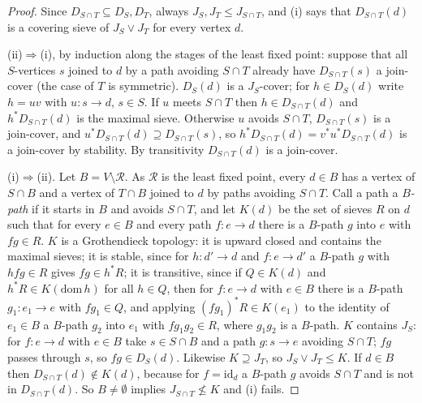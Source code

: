 \documentclass[11pt]{amsart}
\theoremstyle{definition}
\begin{document}
\begin{proof}
Since $D_{S\cap T}\subseteq D_S,D_T$, always $J_S,J_T\le J_{S\cap T}$, and
(i) says that $D_{S\cap T}(d)$ is a covering sieve of $J_S\vee J_T$ for
every vertex $d$.

(ii)$\Rightarrow$(i), by induction along the stages of the least fixed
point: suppose that all $S$-vertices $s$ joined to $d$ by a path avoiding
$S\cap T$ already have $D_{S\cap T}(s)$ a join-cover (the case of $T$ is
symmetric). $D_S(d)$ is a $J_S$-cover; for $h\in D_S(d)$ write $h=uv$
with $u\colon s\to d$, $s\in S$. If $u$ meets $S\cap T$ then $h\in
D_{S\cap T}(d)$ and $h^*D_{S\cap T}(d)$ is the maximal sieve. Otherwise
$u$ avoids $S\cap T$, $D_{S\cap T}(s)$ is a join-cover, and
$u^*D_{S\cap T}(d)\supseteq D_{S\cap T}(s)$, so $h^*D_{S\cap T}(d)=
v^*u^*D_{S\cap T}(d)$ is a join-cover by stability. By transitivity
$D_{S\cap T}(d)$ is a join-cover.

(i)$\Rightarrow$(ii). Let $B=V\setminus\mathcal R$. As $\mathcal R$ is the
least fixed point, every $d\in B$ has a vertex of $S\cap B$ and a vertex of
$T\cap B$ joined to $d$ by paths avoiding $S\cap T$. Call a path a
\emph{$B$-path} if it starts in $B$ and avoids $S\cap T$, and let $K(d)$
be the set of sieves $R$ on $d$ such that for every $e\in B$ and every
path $f\colon e\to d$ there is a $B$-path $g$ into $e$ with $fg\in R$.
$K$ is a Grothendieck topology: it is upward closed and contains the
maximal sieves; it is stable, since for $h\colon d'\to d$ and $f\colon
e\to d'$ a $B$-path $g$ with $hfg\in R$ gives $fg\in h^*R$; it is
transitive, since if $Q\in K(d)$ and $h^*R\in K(\mathrm{dom}\,h)$ for all
$h\in Q$, then for $f\colon e\to d$ with $e\in B$ there is a $B$-path
$g_1\colon e_1\to e$ with $fg_1\in Q$, and applying $(fg_1)^*R\in K(e_1)$
to the identity of $e_1\in B$ a $B$-path $g_2$ into $e_1$ with
$fg_1g_2\in R$, where $g_1g_2$ is a $B$-path. $K$ contains $J_S$: for
$f\colon e\to d$ with $e\in B$ take $s\in S\cap B$ and a path $g\colon
s\to e$ avoiding $S\cap T$; $fg$ passes through $s$, so $fg\in D_S(d)$.
Likewise $K\supseteq J_T$, so $J_S\vee J_T\le K$. If $d\in B$ then
$D_{S\cap T}(d)\notin K(d)$, because for $f=\mathrm{id}_d$ a $B$-path $g$
avoids $S\cap T$ and is not in $D_{S\cap T}(d)$. So $B\ne\emptyset$
implies $J_{S\cap T}\not\le K$ and (i) fails.


\end{proof}
\end{document}
